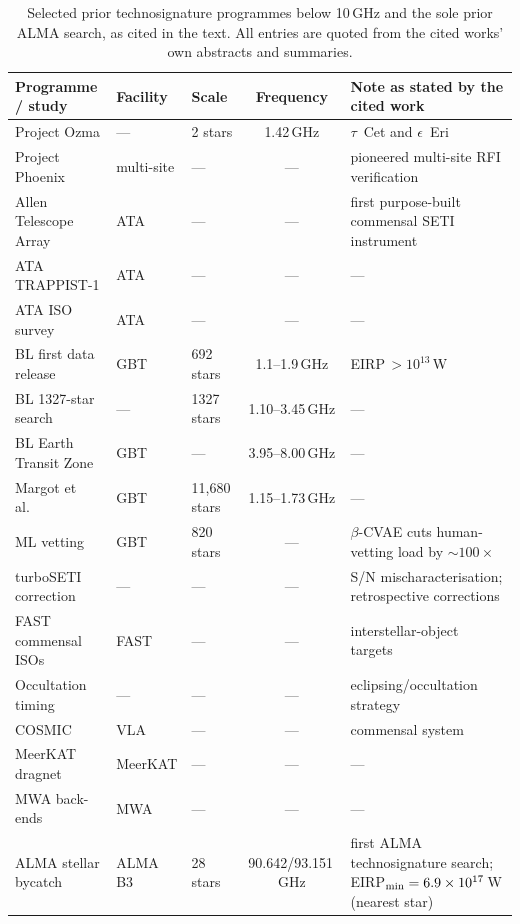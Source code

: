\documentclass{openjournal}
\begin{document}
\begin{table}
\centering
\small
\caption{Selected prior technosignature programmes below 10\,GHz and
the sole prior ALMA search, as cited in the text. All entries are
quoted from the cited works' own abstracts and summaries.}
\label{tab:priorsurveys}
\begin{tabularx}{\textwidth}{@{}lllcX@{}}
\hline
Programme / study & Facility & Scale & Frequency & Note as stated by the cited work \\
\hline
Project Ozma \citep{Drake1960} & --- & 2 stars & 1.42\,GHz & $\tau$~Cet and $\epsilon$~Eri \\
Project Phoenix \citep{Backus2002} & multi-site & --- & --- & pioneered multi-site RFI verification \\
Allen Telescope Array \citep{Tarter2001} & ATA & --- & --- & first purpose-built commensal SETI instrument \\
ATA TRAPPIST-1 \citep{ATATRAPPIST2024} & ATA & --- & --- & --- \\
ATA ISO survey \citep{ATAISO2025} & ATA & --- & --- & --- \\
BL first data release \citep{Enriquez2017} & GBT & 692 stars & 1.1--1.9\,GHz & EIRP\,$>10^{13}$\,W \\
BL 1327-star search \citep{Price2020} & --- & 1327 stars & 1.10--3.45\,GHz & --- \\
BL Earth Transit Zone \citep{Gajjar2019EarthTransitZone} & GBT & --- & 3.95--8.00\,GHz & --- \\
Margot et al.\ \citep{Margot2023} & GBT & 11{,}680 stars & 1.15--1.73\,GHz & --- \\
ML vetting \citep{Ma2023} & GBT & 820 stars & --- & $\beta$-CVAE cuts human-vetting load by ${\sim}100\times$ \\
turboSETI correction \citep{Choza2024} & --- & --- & --- & S/N mischaracterisation; retrospective corrections \\
FAST commensal ISOs \citep{Zhang2020,FAST3IATLAS2025} & FAST & --- & --- & interstellar-object targets \\
Occultation timing \citep{TESSeclipsing2025} & --- & --- & --- & eclipsing/occultation strategy \\
COSMIC \citep{Tremblay2024} & VLA & --- & --- & commensal system \\
MeerKAT dragnet \citep{Czech2021} & MeerKAT & --- & --- & --- \\
MWA back-ends \citep{Morrison2023} & MWA & --- & --- & --- \\
ALMA stellar bycatch \citep{Mason2024} & ALMA B3 & 28 stars & 90.642/93.151\,GHz & first ALMA technosignature search; EIRP$_{\rm min}=6.9\times10^{17}$\,W (nearest star) \\
\hline
\end{tabularx}
\end{table}
\end{document}
